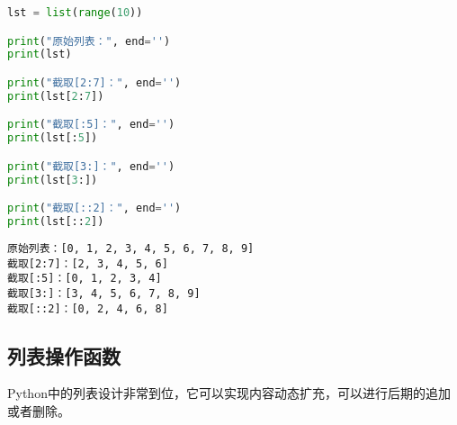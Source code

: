
\begin{lstlisting}[language=Python]
lst = list(range(10))

print("原始列表：", end='')
print(lst)

print("截取[2:7]：", end='')
print(lst[2:7])

print("截取[:5]：", end='')
print(lst[:5])

print("截取[3:]：", end='')
print(lst[3:])

print("截取[::2]：", end='')
print(lst[::2])
\end{lstlisting}

\begin{tcolorbox}
	\begin{verbatim}
原始列表：[0, 1, 2, 3, 4, 5, 6, 7, 8, 9]
截取[2:7]：[2, 3, 4, 5, 6]
截取[:5]：[0, 1, 2, 3, 4]
截取[3:]：[3, 4, 5, 6, 7, 8, 9]
截取[::2]：[0, 2, 4, 6, 8]
\end{verbatim}
\end{tcolorbox}

\vspace{0.5cm}

\subsection{列表操作函数}

Python中的列表设计非常到位，它可以实现内容动态扩充，可以进行后期的追加或者删除。

\begin{table}[H]
	\centering
	\caption{列表操作函数}
\end{table}

